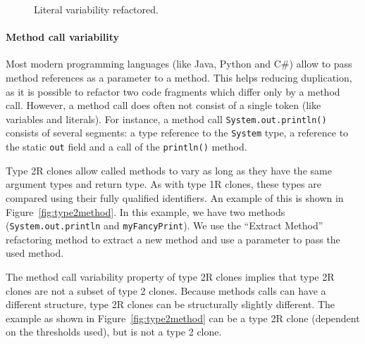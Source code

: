 \begin{figure}[H]
\begin{parcolumns}{2}
\end{parcolumns}
\caption{Literal variability refactored.}
\label{fig:type2literal}
\end{figure}

\paragraph{Method call variability}
Most modern programming languages (like Java, Python and C\#) allow to pass method references as a parameter to a method. This helps reducing duplication, as it is possible to refactor two code fragments which differ only by a method call. However, a method call does often not consist of a single token (like variables and literals). For instance, a method call \texttt{System.out.println()} consists of several segments: a type reference to the \texttt{System} type, a reference to the static \texttt{out} field and a call of the \texttt{println()} method.

Type 2R clones allow called methods to vary as long as they have the same argument types and return type. As with type 1R clones, these types are compared using their fully qualified identifiers. An example of this is shown in Figure~\ref{fig:type2method}. In this example, we have two methods (\texttt{System.out.println} and \texttt{myFancyPrint}). We use the ``Extract Method'' refactoring method to extract a new method and use a parameter to pass the used method.

The method call variability property of type 2R clones implies that type 2R clones are not a subset of type 2 clones. Because methods calls can have a different structure, type 2R clones can be structurally slightly different. The example as shown in Figure~\ref{fig:type2method} can be a type 2R clone (dependent on the thresholds used), but is not a type 2 clone.

